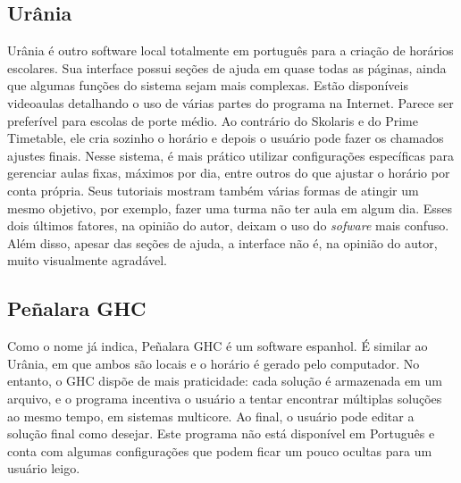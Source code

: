 \documentclass{subfiles}
\begin{document}
\subsection{Urânia}

	\par Urânia é outro software local totalmente em português para a criação de horários escolares. Sua interface possui seções de ajuda em quase todas as páginas, ainda que algumas funções do sistema sejam mais complexas. Estão disponíveis videoaulas detalhando o uso de várias partes do programa na Internet. Parece ser preferível para escolas de porte médio. Ao contrário do Skolaris e do Prime Timetable, ele cria sozinho o horário e depois o usuário pode fazer os chamados ajustes finais. Nesse sistema, é mais prático utilizar configurações específicas para gerenciar aulas fixas, máximos por dia, entre outros do que ajustar o horário por conta própria. Seus tutoriais mostram também várias formas de atingir um mesmo objetivo, por exemplo, fazer uma turma não ter aula em algum dia. Esses dois últimos fatores, na opinião do autor, deixam o uso do \textit{sofware} mais confuso. Além disso, apesar das seções de ajuda, a interface não é, na opinião do autor, muito visualmente agradável.

\subsection{Peñalara GHC}

	\par Como o nome já indica, Peñalara GHC é um software espanhol. É similar ao Urânia, em que ambos são locais e o horário é gerado pelo computador. No entanto, o GHC dispõe de mais praticidade: cada solução é armazenada em um arquivo, e o programa incentiva o usuário a tentar encontrar múltiplas soluções ao mesmo tempo, em sistemas multicore. Ao final, o usuário pode editar a solução final como desejar. Este programa não está disponível em Português e conta com algumas configurações que podem ficar um pouco ocultas para um usuário leigo.

\vspace{1cm}

\end{document}
